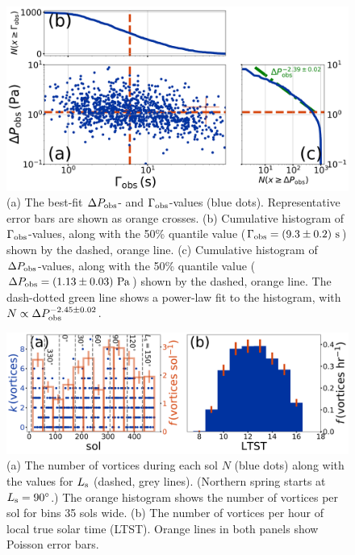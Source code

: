 \documentclass{aastex63}
\begin{document}
\begin{figure}
    \centering
    \includegraphics[width=\textwidth]{figures/DeltaPobs_vs_Gammaobs.png}
    \caption{(a) The best-fit $\Delta P_{\rm obs}$- and $\Gamma_{\rm obs}$-values (blue dots). Representative error bars are shown as orange crosses. (b) Cumulative histogram of $\Gamma_{\rm obs}$-values, along with the 50\% quantile value ($\Gamma_{\rm obs} = \left( 9.3 \pm 0.2 \right)\,{\rm s}$) shown by the dashed, orange line. (c) Cumulative histogram of $\Delta P_{\rm obs}$-values, along with the 50\% quantile value ($\Delta P_{\rm obs} = \left( 1.13 \pm 0.03 \right)\,{\rm Pa}$) shown by the dashed, orange line. The dash-dotted green line shows a power-law fit to the histogram, with $N \propto \Delta P_{\rm obs}^{-2.45\pm0.02}$.}
    \label{fig:DeltaPobs_vs_Gammaobs}
\end{figure}

\begin{figure}
    \centering
    \includegraphics[width=\textwidth]{figures/sol_and_t0_histograms.png}
    \caption{(a) The number of vortices during each sol $N$ (blue dots) along with the values for $L_{\rm s}$ (dashed, grey lines). (Northern spring starts at $L_{\rm s} = 90^\circ$.) The orange histogram shows the number of vortices per sol for bins 35 sols wide. (b) The number of vortices per hour of local true solar time (LTST). Orange lines in both panels show Poisson error bars.}
    \label{fig:sol_and_t0_histograms}
\end{figure}
\end{document}
